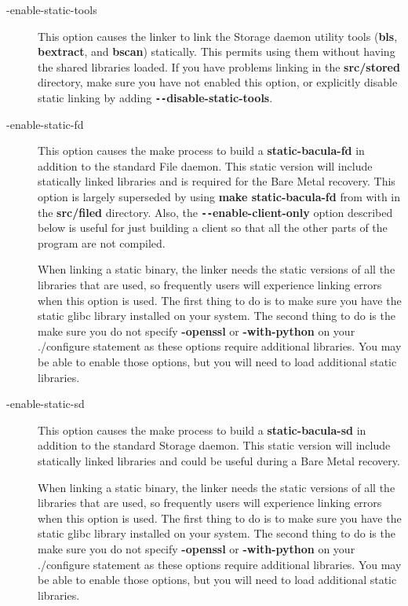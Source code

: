 \begin{description}
\item [ {-}{\-}enable-static-tools]
   This option causes the linker to link the Storage daemon utility tools
   ({\bf bls}, {\bf bextract}, and {\bf bscan}) statically.  This permits
   using them without having the shared libraries loaded.  If you have
   problems linking in the {\bf src/stored} directory, make sure you have
   not enabled this option, or explicitly disable static linking by adding
   {\bf \verb:--:disable-static-tools}.

\item [ {-}{\-}enable-static-fd]
   This option causes the make process to build a {\bf static-bacula-fd} in
   addition to the standard File daemon.  This static version will include
   statically linked libraries and is required for the Bare Metal recovery.
   This option is largely superseded by using {\bf make static-bacula-fd}
   from with in the {\bf src/filed} directory.  Also, the {\bf
   \verb:--:enable-client-only} option described below is useful for just
   building a client so that all the other parts of the program are not
   compiled.   
     
   When linking a static binary, the linker needs the static versions
   of all the libraries that are used, so frequently users will 
   experience linking errors when this option is used. The first 
   thing to do is to make sure you have the static glibc library 
   installed on your system. The second thing to do is the make sure
   you do not specify {\bf {-}{\-}openssl} or {\bf {-}{\-}with-python}
   on your ./configure statement as these options require additional
   libraries. You may be able to enable those options, but you will
   need to load additional static libraries.


\item [ {-}{\-}enable-static-sd]
   This option causes the make process to build a {\bf static-bacula-sd} in
   addition to the standard Storage daemon.  This static version will
   include statically linked libraries and could be useful during a Bare
   Metal recovery.

   When linking a static binary, the linker needs the static versions
   of all the libraries that are used, so frequently users will 
   experience linking errors when this option is used. The first 
   thing to do is to make sure you have the static glibc library 
   installed on your system. The second thing to do is the make sure
   you do not specify {\bf {-}{\-}openssl} or {\bf {-}{\-}with-python}
   on your ./configure statement as these options require additional
   libraries. You may be able to enable those options, but you will
   need to load additional static libraries.



\end{description}
